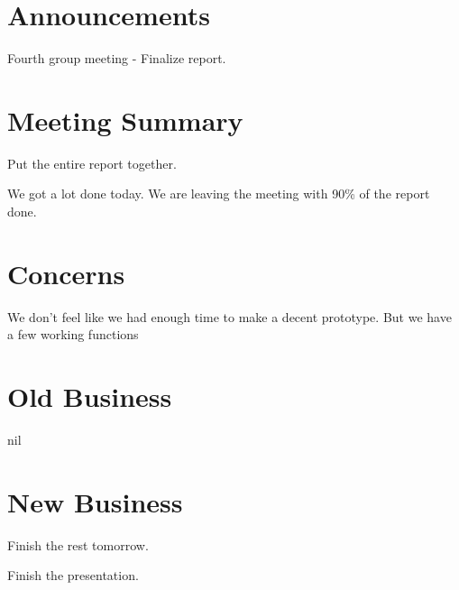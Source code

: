 \documentclass[11pt]{meetingmins}
\begin{document}
\maketitle

\section{Announcements}
\begin{hiddenitems}
\item Fourth group meeting - Finalize report.

\end{hiddenitems}

\section{Meeting Summary}
\begin{items}

\item
Put the entire report together.

\item
We got a lot done today. We are leaving the meeting with 90\% of the report done.

\item


\end{items}


\section{Concerns}
\begin{items}
\item We don't feel like we had enough time to make a decent prototype. But we have a few working functions
\end{items}

\section{Old Business}
\begin{items}

\item nil

\end{items}

\section{New Business}
\begin{items}
\item
Finish the rest tomorrow.

\item
Finish the presentation.

\end{items}

\vspace{1em}
\end{document}
